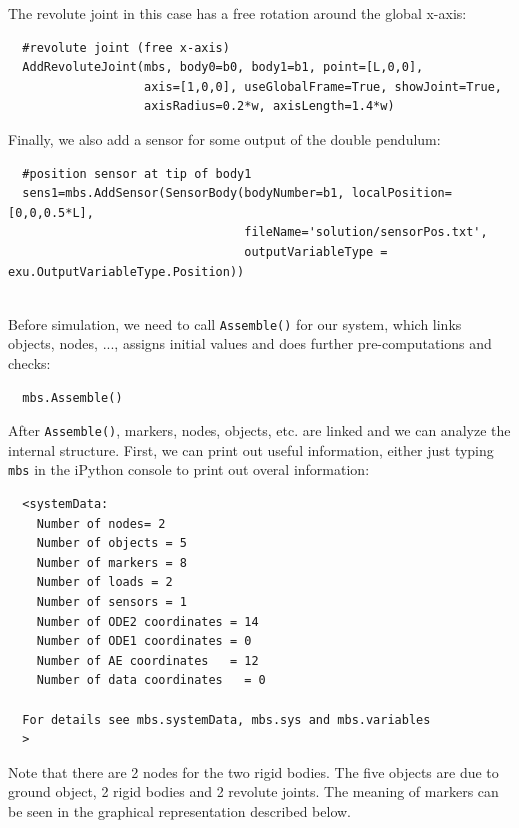 \noindent The revolute joint in this case has a free rotation around the global x-axis:
\pythonstyle\begin{lstlisting}
  #revolute joint (free x-axis)
  AddRevoluteJoint(mbs, body0=b0, body1=b1, point=[L,0,0], 
                   axis=[1,0,0], useGlobalFrame=True, showJoint=True,
                   axisRadius=0.2*w, axisLength=1.4*w)
\end{lstlisting}

\noindent Finally, we also add a sensor for some output of the double pendulum:
\pythonstyle\begin{lstlisting}
  #position sensor at tip of body1
  sens1=mbs.AddSensor(SensorBody(bodyNumber=b1, localPosition=[0,0,0.5*L],
                                 fileName='solution/sensorPos.txt',
                                 outputVariableType = exu.OutputVariableType.Position))
\end{lstlisting}
%

\horizontalRuler\\
\noindent Before simulation, we need to call \texttt{Assemble()} for our system, which links objects, nodes, ..., assigns initial values and does further pre-computations and checks:
\pythonstyle\begin{lstlisting}
  mbs.Assemble()
\end{lstlisting}
After \texttt{Assemble()}, markers, nodes, objects, etc. are linked and we can analyze the internal structure. First, we can print out useful information, either just typing \texttt{mbs} in the iPython console to print out overal information:
\plainlststyle
\begin{lstlisting}
  <systemData: 
    Number of nodes= 2
    Number of objects = 5
    Number of markers = 8
    Number of loads = 2
    Number of sensors = 1
    Number of ODE2 coordinates = 14
    Number of ODE1 coordinates = 0
    Number of AE coordinates   = 12
    Number of data coordinates   = 0

  For details see mbs.systemData, mbs.sys and mbs.variables
  >
\end{lstlisting}
%
Note that there are 2 nodes for the two rigid bodies. The five objects are due to ground object, 2 rigid bodies and 2 revolute joints.
The meaning of markers can be seen in the graphical representation described below.

